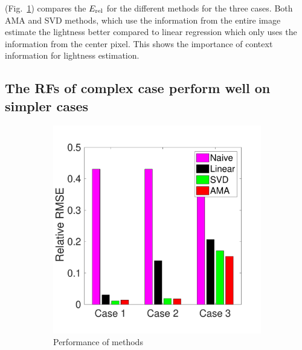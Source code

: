 \documentclass{jov}
\begin{document}
(Fig.~\ref{fig:summaryBarGraph}) compares the $E_{\rm rel}$ for the different methods for the three cases. Both AMA and SVD methods, which use the information from the entire image estimate the lightness better compared to linear regression which only uses the information from the center pixel. This shows the importance of context information for lightness estimation.

\subsection{The RFs of complex case perform well on simpler cases}
\begin{figure}
\centering
\begin{subfigure}{0.3 \textwidth}
	\includegraphics[width=\textwidth]{../Figures/Figure8/Figure8_a.pdf}
	\caption{Performance of methods}
	\label{fig:summaryBarGraph}
    \end{subfigure}
    ~ %
    \begin{subfigure}{0.3 \textwidth}   

\end{subfigure}
\end{figure}
\end{document}
